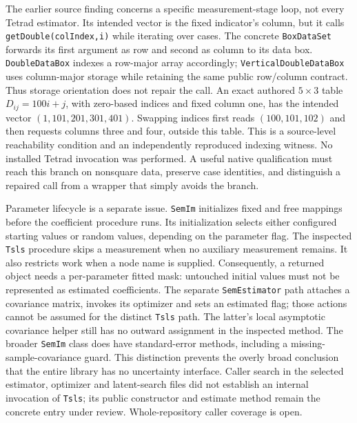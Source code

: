 The earlier source finding concerns a specific measurement-stage loop, not every Tetrad estimator. Its intended vector is the fixed indicator's column, but it calls \texttt{getDouble(colIndex,i)} while iterating over cases. The concrete \texttt{BoxDataSet} forwards its first argument as row and second as column to its data box. \texttt{DoubleDataBox} indexes a row-major array accordingly; \texttt{VerticalDoubleDataBox} uses column-major storage while retaining the same public row/column contract. Thus storage orientation does not repair the call. An exact authored $5\times3$ table $D_{ij}=100i+j$, with zero-based indices and fixed column one, has the intended vector $(1,101,201,301,401)$. Swapping indices first reads $(100,101,102)$ and then requests columns three and four, outside this table. This is a source-level reachability condition and an independently reproduced indexing witness. No installed Tetrad invocation was performed. A useful native qualification must reach this branch on nonsquare data, preserve case identities, and distinguish a repaired call from a wrapper that simply avoids the branch.~\citep{exec25_javaiv_tetrad,exec25_javaiv_choice}

Parameter lifecycle is a separate issue. \texttt{SemIm} initializes fixed and free mappings before the coefficient procedure runs. Its initialization selects either configured starting values or random values, depending on the parameter flag. The inspected \texttt{Tsls} procedure skips a measurement when no auxiliary measurement remains. It also restricts work when a node name is supplied. Consequently, a returned object needs a per-parameter fitted mask: untouched initial values must not be represented as estimated coefficients. The separate \texttt{SemEstimator} path attaches a covariance matrix, invokes its optimizer and sets an estimated flag; those actions cannot be assumed for the distinct \texttt{Tsls} path. The latter's local asymptotic covariance helper still has no outward assignment in the inspected method. The broader \texttt{SemIm} class does have standard-error methods, including a missing-sample-covariance guard. This distinction prevents the overly broad conclusion that the entire library has no uncertainty interface. Caller search in the selected estimator, optimizer and latent-search files did not establish an internal invocation of \texttt{Tsls}; its public constructor and estimate method remain the concrete entry under review. Whole-repository caller coverage is open.~\citep{exec25_javaiv_tetrad,exec22_java_latent_iv_preflight}

